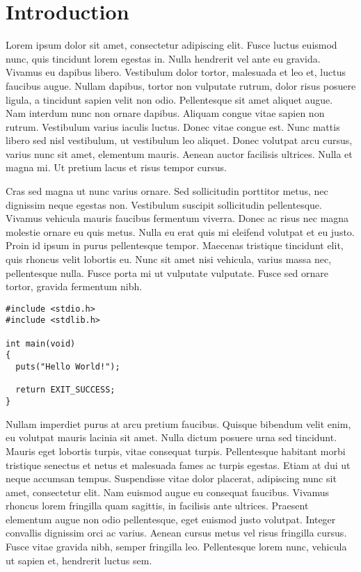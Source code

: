 \chapter*{Introduction}

Lorem ipsum dolor sit amet, consectetur adipiscing elit. Fusce luctus
euismod nunc, quis tincidunt lorem egestas in. Nulla hendrerit vel
ante eu gravida. Vivamus eu dapibus libero. Vestibulum dolor tortor,
malesuada et leo et, luctus faucibus augue. Nullam dapibus, tortor non
vulputate rutrum, dolor risus posuere ligula, a tincidunt sapien velit
non odio. Pellentesque sit amet aliquet augue. Nam interdum nunc non
ornare dapibus. Aliquam congue vitae sapien non rutrum. Vestibulum
varius iaculis luctus. Donec vitae congue est. Nunc mattis libero sed
nisl vestibulum, ut vestibulum leo aliquet. Donec volutpat arcu
cursus, varius nunc sit amet, elementum mauris. Aenean auctor
facilisis ultrices. Nulla et magna mi. Ut pretium lacus et risus
tempor cursus.

Cras sed magna ut nunc varius ornare. Sed sollicitudin porttitor metus,
nec dignissim neque egestas non. Vestibulum suscipit sollicitudin
pellentesque. Vivamus vehicula mauris faucibus fermentum viverra. Donec
ac risus nec magna molestie ornare eu quis metus. Nulla eu erat quis mi
eleifend volutpat et eu justo. Proin id ipsum in purus pellentesque
tempor. Maecenas tristique tincidunt elit, quis rhoncus velit lobortis
eu. Nunc sit amet nisi vehicula, varius massa nec, pellentesque nulla.
Fusce porta mi ut vulputate vulputate. Fusce sed ornare tortor, gravida
fermentum nibh.

\begin{verbatim}
#include <stdio.h>
#include <stdlib.h>

int main(void)
{
  puts("Hello World!");

  return EXIT_SUCCESS;
}
\end{verbatim}

Nullam imperdiet purus at arcu pretium faucibus. Quisque bibendum
velit enim, eu volutpat mauris lacinia sit amet. Nulla dictum posuere
urna sed tincidunt. Mauris eget lobortis turpis, vitae consequat
turpis. Pellentesque habitant morbi tristique senectus et netus et
malesuada fames ac turpis egestas. Etiam at dui ut neque accumsan
tempus. Suspendisse vitae dolor placerat, adipiscing nunc sit amet,
consectetur elit. Nam euismod augue eu consequat faucibus. Vivamus
rhoncus lorem fringilla quam sagittis, in facilisis ante ultrices.
Praesent elementum augue non odio pellentesque, eget euismod justo
volutpat. Integer convallis dignissim orci ac varius. Aenean cursus
metus vel risus fringilla cursus. Fusce vitae gravida nibh, semper
fringilla leo. Pellentesque lorem nunc, vehicula ut sapien et,
hendrerit luctus sem.

